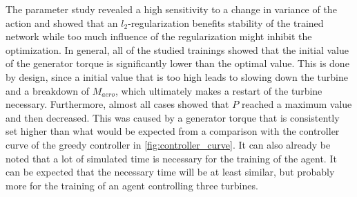 The parameter study revealed a high sensitivity to a change in variance of the action and showed that an $l_2$-regularization benefits stability of the trained network while too much influence of the regularization might inhibit the optimization. In general, all of the studied trainings showed that the initial value of the generator torque is significantly lower than the optimal value. This is done by design, since a initial value that is too high leads to slowing down the turbine and a breakdown of $M_{aero}$, which ultimately makes a restart of the turbine necessary. Furthermore, almost all cases showed that $P$ reached a maximum value and then decreased. This was caused by a generator torque that is consistently set higher than what would be expected from a comparison with the controller curve of the greedy controller in \autoref{fig:controller_curve}. It can also already be noted that a lot of simulated time is necessary for the training of the agent. It can be expected that the necessary time will be at least similar, but probably more for the training of an agent controlling three turbines. \newpage
